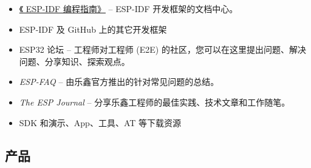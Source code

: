 {\begin{minipage}{\textwidth}
\begin{itemize}
  \ifcsname linkidfprogguideCN\endcsname%
    \item \href{\linkprefix\linkidfprogguideCN}{《\chipseries{} ESP-IDF 编程指南》} --
        {\small ESP-IDF 开发框架的文档中心。}
  \fi%

    \item ESP-IDF 及 GitHub 上的其它开发框架\\
        \href{\linkprefix\linkgithub}{\linkprefix\linkgithub}

    \item ESP32 论坛 --
        {\small 工程师对工程师 (E2E) 的社区，您可以在这里提出问题、解决问题、分享知识、探索观点。}\\
        \href{\linkprefix\linkespforum}{\linkprefix\linkespforum}

    \item \textit{ESP-FAQ} --
        {\small 由乐鑫官方推出的针对常见问题的总结。}\\
        \href{\linkprefix\linkespfaqCN}{\linkprefix\linkespfaqCN}

    \item \textit{The ESP Journal} --
        {\small 分享乐鑫工程师的最佳实践、技术文章和工作随笔。}\\
        \href{\linkprefix\linkespjournal}{\linkprefix\linkespjournal}

    \item SDK 和演示、App、工具、AT 等下载资源\\
        \href{\linkprefix\linksdkdemoCN}{\linkprefix\linksdkdemoCN}
\end{itemize}

\end{minipage}



\begin{minipage}{\textwidth}

\subsection*{产品}


\end{minipage}}
